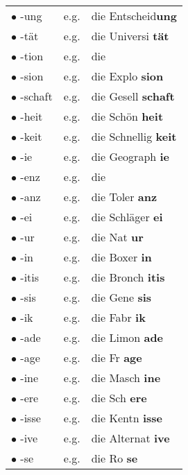 \documentclass[a4paper,twocolumn,10pt]{article}
\begin{document}
\begin{xtabular}{l r l}

  $\bullet$ -ung    & e.g. & die Entscheid\textbf{\textcolor{green-goethe}{ung}} \\
  $\bullet$ -tät    & e.g. & die Universi
\textcolor{green-goethe}{\textbf{tät}}  \\
  $\bullet$ -tion   & e.g. & die     \\
  $\bullet$ -sion   & e.g. & die Explo \textcolor{green-goethe}{\textbf{sion}}    \\
  $\bullet$ -schaft & e.g. & die Gesell \textcolor{green-goethe}{\textbf{schaft}} \\
  $\bullet$ -heit   & e.g. & die Schön \textcolor{green-goethe}{\textbf{heit}}    \\
  $\bullet$ -keit   & e.g. & die Schnellig
\textcolor{green-goethe}{\textbf{keit}}\\
  $\bullet$ -ie     & e.g. & die Geograph
\textcolor{green-goethe}{\textbf{ie}}   \\
  $\bullet$ -enz    & e.g. & die              \\
  $\bullet$ -anz    & e.g. & die Toler \textcolor{green-goethe}{\textbf{anz}}     \\
  $\bullet$ -ei     & e.g. & die Schläger
\textcolor{green-goethe}{\textbf{ei}}   \\
  $\bullet$ -ur     & e.g. & die Nat \textcolor{green-goethe}{\textbf{ur}}        \\
  $\bullet$ -in     & e.g. & die Boxer \textcolor{green-goethe}{\textbf{in}}      \\
  $\bullet$ -itis   & e.g. & die Bronch \textcolor{green-goethe}{\textbf{itis}} \\
  $\bullet$ -sis    & e.g. & die Gene \textcolor{green-goethe}{\textbf{sis}}\\
  $\bullet$ -ik     & e.g. & die Fabr \textcolor{green-goethe}{\textbf{ik}}\\
  $\bullet$ -ade    & e.g. & die Limon \textcolor{green-goethe}{\textbf{ade}}\\
  $\bullet$ -age    & e.g. & die Fr \textcolor{green-goethe}{\textbf{age}}\\
  $\bullet$ -ine    & e.g. & die Masch \textcolor{green-goethe}{\textbf{ine}}\\
  $\bullet$ -ere    & e.g. & die Sch \textcolor{green-goethe}{\textbf{ere}}\\
  $\bullet$ -isse   & e.g. & die Kentn \textcolor{green-goethe}{\textbf{isse}}\\
  $\bullet$ -ive    & e.g. & die Alternat
\textcolor{green-goethe}{\textbf{ive}}\\
  $\bullet$ -se     & e.g. & die Ro \textcolor{green-goethe}{\textbf{se}}\\

\end{xtabular}
\end{document}

